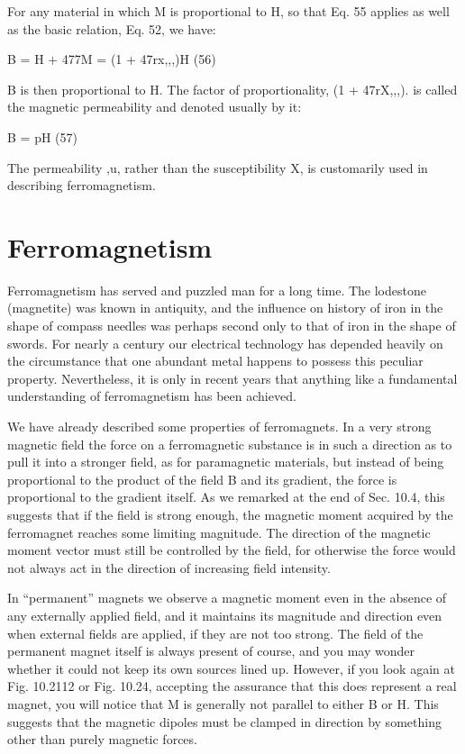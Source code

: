 {{For any material in which M is proportional to H, so that Eq. 55
applies as well as the basic relation, Eq. 52, we have:

B = H + 477M = (1 + 47rx,,,)H (56)

B is then proportional to H. The factor of proportionality,
(1 + 47rX,,,). is called the magnetic permeability and denoted usually
by it:

B = pH (57)

The permeability ,u, rather than the susceptibility X, is customarily
used in describing ferromagnetism.

\section{Ferromagnetism}

Ferromagnetism has served and puzzled man for a long time.
The lodestone (magnetite) was known in antiquity, and the influence
on history of iron in the shape of compass needles was perhaps second
only to that of iron in the shape of swords. For nearly a century
our electrical technology has depended heavily on the circumstance
that one abundant metal happens to possess this peculiar property.
Nevertheless, it is only in recent years that anything like a fundamental
understanding of ferromagnetism has been achieved.

We have already described some properties of ferromagnets. In
a very strong magnetic field the force on a ferromagnetic substance
is in such a direction as to pull it into a stronger field, as for 
paramagnetic materials, but instead of being proportional to the product
of the field B and its gradient, the force is proportional to the gradient
itself. As we remarked at the end of Sec. 10.4, this suggests
that if the field is strong enough, the magnetic moment acquired by
the ferromagnet reaches some limiting magnitude. The direction
of the magnetic moment vector must still be controlled by the field,
for otherwise the force would not always act in the direction of increasing
field intensity.

In ``permanent'' magnets we observe a magnetic moment even in
the absence of any externally applied field, and it maintains its magnitude
and direction even when external fields are applied, if they
are not too strong. The field of the permanent magnet itself is always
present of course, and you may wonder whether it could not keep
its own sources lined up. However, if you look again at Fig. 10.2112
or Fig. 10.24, accepting the assurance that this does represent a real
magnet, you will notice that M is generally not parallel to either B
or H. This suggests that the magnetic dipoles must be clamped in
direction by something other than purely magnetic forces.

}}
